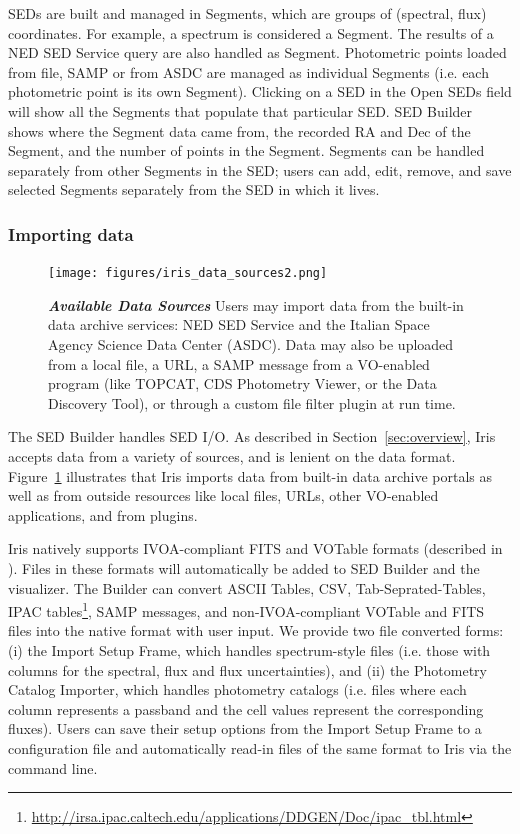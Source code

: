 \documentclass[5p]{elsarticle}
\begin{document}
SEDs are built and managed in Segments, which are groups of (spectral, flux) coordinates. For example, a spectrum is considered a Segment. The results of a NED SED Service query are also handled as Segment. Photometric points loaded from file, SAMP or from ASDC are managed as individual Segments (i.e. each photometric point is its own Segment). Clicking on a SED in the Open SEDs field will show all the Segments that populate that particular SED. SED Builder shows where the Segment data came from, the recorded RA and Dec of the Segment, and the number of points in the Segment. Segments can be handled separately from other Segments in the SED; users can add, edit, remove, and save selected Segments separately from the SED in which it lives.

\subsubsection{Importing data}

\begin{figure}
\begin{center}
\texttt{[image: figures/iris\_data\_sources2.png]}
\caption{\textit{\textbf{\label{fig:data_sources} Available Data Sources}}\textit{}\textbf{}\textit{} Users may import data from the built-in data archive services: NED SED Service and the Italian Space Agency Science Data Center (ASDC). Data may also be uploaded from a local file, a URL, a SAMP message from a VO-enabled program (like TOPCAT, CDS Photometry Viewer, or the Data Discovery Tool), or through a custom file filter plugin at run time.}
\end{center}
\end{figure}

The SED Builder handles SED I/O. As described in Section~\ref{sec:overview}, Iris accepts data from a variety of sources, and is lenient on the data format. Figure~\ref{fig:data_sources} illustrates that Iris imports data from built-in data archive portals as well as from outside resources like local files, URLs, other VO-enabled applications, and from plugins.

Iris natively supports IVOA-compliant FITS and VOTable formats (described in \cite{2012arXiv1204.3055M}). Files in these formats will automatically be added to SED Builder and the visualizer. The Builder can convert ASCII Tables, CSV, Tab-Seprated-Tables, IPAC tables\footnote{\url{http://irsa.ipac.caltech.edu/applications/DDGEN/Doc/ipac\_tbl.html}}, SAMP messages, and non-IVOA-compliant VOTable and FITS files into the native format with user input. We provide two file converted forms: (i) the Import Setup Frame, which handles spectrum-style files (i.e. those with columns for the spectral, flux and flux uncertainties), and (ii) the Photometry Catalog Importer, which handles photometry catalogs (i.e. files where each column represents a passband and the cell values represent the corresponding fluxes). Users can save their setup options from the Import Setup Frame to a configuration file and automatically read-in files of the same format to Iris via the command line.
\end{document}
